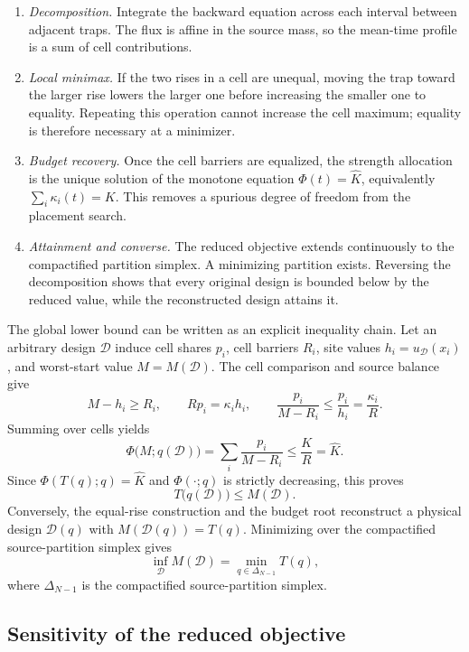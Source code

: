 \documentclass[10pt]{article}
\begin{document}
\begin{enumerate}
\item \emph{Decomposition.} Integrate the backward equation across each interval between adjacent traps. The flux is affine in the source mass, so the mean-time profile is a sum of cell contributions.
\item \emph{Local minimax.} If the two rises in a cell are unequal, moving the trap toward the larger rise lowers the larger one before increasing the smaller one to equality. Repeating this operation cannot increase the cell maximum; equality is therefore necessary at a minimizer.
\item \emph{Budget recovery.} Once the cell barriers are equalized, the strength allocation is the unique solution of the monotone equation $\Phi(t)=\widehat K$, equivalently $\sum_i\kappa_i(t)=K$. This removes a spurious degree of freedom from the placement search.
\item \emph{Attainment and converse.} The reduced objective extends continuously to the compactified partition simplex. A minimizing partition exists. Reversing the decomposition shows that every original design is bounded below by the reduced value, while the reconstructed design attains it.
\end{enumerate}

The global lower bound can be written as an explicit inequality chain. Let an arbitrary design $\mathcal D$ induce cell shares $p_i$, cell barriers $R_i$, site values $h_i=u_{\mathcal D}(x_i)$, and worst-start value $M=M(\mathcal D)$. The cell comparison and source balance give
\[
M-h_i\ge R_i,
\qquad
Rp_i=\kappa_i h_i,
\qquad
\frac{p_i}{M-R_i}\le\frac{p_i}{h_i}=\frac{\kappa_i}{R}.
\]
Summing over cells yields
\[
\Phi\bigl(M;q(\mathcal D)\bigr)
=\sum_i\frac{p_i}{M-R_i}
\le\frac{K}{R}=\widehat K.
\]
Since $\Phi(T(q);q)=\widehat K$ and $\Phi(\mathord\cdot;q)$ is strictly decreasing, this proves
\[
T\bigl(q(\mathcal D)\bigr)\le M(\mathcal D).
\]
Conversely, the equal-rise construction and the budget root reconstruct a physical design $\mathcal D(q)$ with $M(\mathcal D(q))=T(q)$. Minimizing over the compactified source-partition simplex gives
\[
\inf_{\mathcal D}M(\mathcal D)=\min_{q\in\Delta_{N-1}}T(q),
\]
where $\Delta_{N-1}$ is the compactified source-partition simplex.

\subsection{Sensitivity of the reduced objective}
\end{document}
